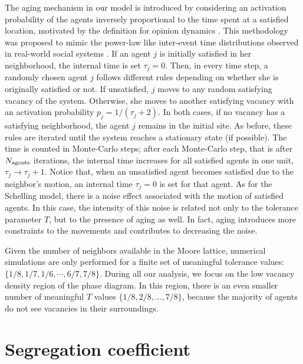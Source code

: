 The aging mechanism in our model is introduced by considering an activation probability of the agents inversely proportional to the time spent at a satisfied location, motivated by the definition for opinion dynamics \cite{artime-2018}. This methodology was proposed to mimic the power-law like inter-event time distributions observed in real-world social systems \cite{barabasi-2005,fernandez-gracia-2011}. If an agent $j$ is initially satisfied in her neighborhood, the internal time is set $\tau_j = 0$. Then, in every time step, a randomly chosen agent $j$ follows different rules depending on whether she is originally satisfied or not. If unsatisfied, $j$ moves to any random satisfying vacancy of the system. Otherwise, she moves to another satisfying vacancy with an activation probability $p_j = 1 / (\tau_j + 2)$. In both cases, if no vacancy has a satisfying neighborhood, the agent $j$ remains in the initial site. As before, these rules are iterated until the system reaches a stationary state (if possible). The time is counted in Monte-Carlo steps; after each Monte-Carlo step, that is after $N_{\rm agents}$ iterations, the internal time increases for all satisfied agents in one unit, $\tau_j \to \tau_j + 1$. Notice that, when an unsatisfied agent becomes satisfied due to the neighbor's motion, an internal time $\tau_j = 0$ is set for that agent. As for the Schelling model, there is a noise effect associated with the motion of satisfied agents. In this case, the intensity of this noise is related not only to the tolerance parameter $T$, but to the presence of aging as well. In fact, aging introduces more constraints to the movements and contributes to decreasing the noise.  

Given the number of neighbors available in the Moore lattice, numerical simulations are only performed for a finite set of meaningful tolerance values: $\{1/8,1/7,1/6, \cdots ,6/7,7/8 \}$. During all our analysis, we focus on the low vacancy density region of the phase diagram. In this region, there is an even smaller number of meaningful $T$ values $\{1/8,2/8,...,7/8\}$, because the majority of agents do not see vacancies in their surroundings.

\section{Segregation coefficient}

